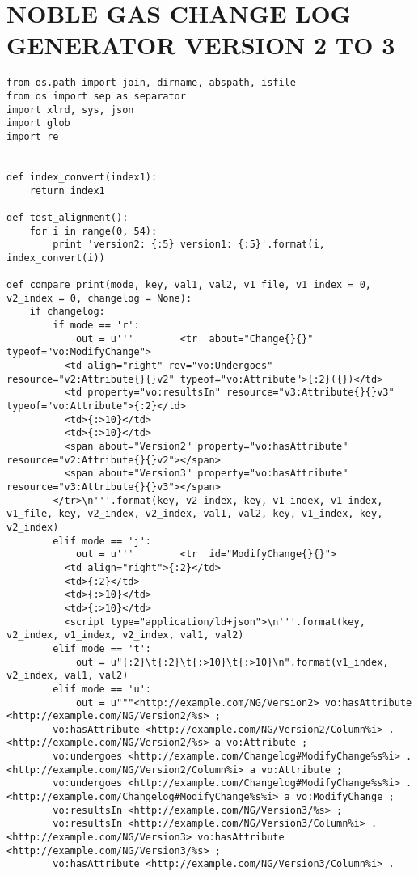 \chapter{NOBLE GAS CHANGE LOG GENERATOR VERSION 2 TO 3}
\begin{verbatim}
from os.path import join, dirname, abspath, isfile
from os import sep as separator
import xlrd, sys, json
import glob
import re


def index_convert(index1):
	return index1

def test_alignment():
	for i in range(0, 54):
		print 'version2: {:5} version1: {:5}'.format(i, index_convert(i))

def compare_print(mode, key, val1, val2, v1_file, v1_index = 0, v2_index = 0, changelog = None):
	if changelog:
		if mode == 'r':
			out = u'''        <tr  about="Change{}{}" typeof="vo:ModifyChange">
          <td align="right" rev="vo:Undergoes" resource="v2:Attribute{}{}v2" typeof="vo:Attribute">{:2}({})</td>
          <td property="vo:resultsIn" resource="v3:Attribute{}{}v3" typeof="vo:Attribute">{:2}</td>
          <td>{:>10}</td>
          <td>{:>10}</td>
          <span about="Version2" property="vo:hasAttribute" resource="v2:Attribute{}{}v2"></span>
          <span about="Version3" property="vo:hasAttribute" resource="v3:Attribute{}{}v3"></span>
        </tr>\n'''.format(key, v2_index, key, v1_index, v1_index, v1_file, key, v2_index, v2_index, val1, val2, key, v1_index, key, v2_index)
		elif mode == 'j':
			out = u'''        <tr  id="ModifyChange{}{}">
          <td align="right">{:2}</td>
          <td>{:2}</td>
          <td>{:>10}</td>
          <td>{:>10}</td>
          <script type="application/ld+json">\n'''.format(key, v2_index, v1_index, v2_index, val1, val2)
		elif mode == 't':
			out = u"{:2}\t{:2}\t{:>10}\t{:>10}\n".format(v1_index, v2_index, val1, val2)
		elif mode == 'u':
			out = u"""<http://example.com/NG/Version2> vo:hasAttribute <http://example.com/NG/Version2/%s> ;
        vo:hasAttribute <http://example.com/NG/Version2/Column%i> .
<http://example.com/NG/Version2/%s> a vo:Attribute ;
        vo:undergoes <http://example.com/Changelog#ModifyChange%s%i> .
<http://example.com/NG/Version2/Column%i> a vo:Attribute ;
        vo:undergoes <http://example.com/Changelog#ModifyChange%s%i> .
<http://example.com/Changelog#ModifyChange%s%i> a vo:ModifyChange ;
        vo:resultsIn <http://example.com/NG/Version3/%s> ;
        vo:resultsIn <http://example.com/NG/Version3/Column%i> .
<http://example.com/NG/Version3> vo:hasAttribute <http://example.com/NG/Version3/%s> ;
        vo:hasAttribute <http://example.com/NG/Version3/Column%i> .


\end{verbatim}
